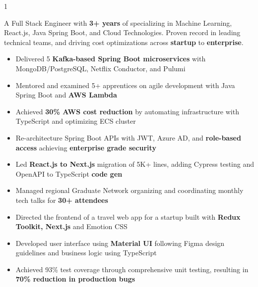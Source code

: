 \documentclass[11pt,a4paper,ragged2e]{altacv}
\begin{document}

\makecvheader


\begin{paracol}{1}
\smallskip
{}

A Full Stack Engineer with \textbf{3+ years} of specializing in Machine Learning, React.js, Java Spring Boot, and Cloud Technologies. Proven record in leading technical teams, and driving cost optimizations across \textbf{startup} to \textbf{enterprise}.
\smallskip


\begin{itemize}
\item Delivered 5 \textbf{Kafka-based Spring Boot microservices} with MongoDB/PostgreSQL, Netflix Conductor, and Pulumi
\item Mentored and examined 5+ apprentices on agile development with Java Spring Boot and \textbf{AWS Lambda}
\item Achieved \textbf{30\% AWS cost reduction} by automating infrastructure with TypeScript and optimizing ECS cluster
\item Re-architecture Spring Boot APIs with JWT, Azure AD, and \textbf{role-based access} achieving \textbf{enterprise grade security}
\item Led \textbf{React.js to Next.js} migration of 5K+ lines, adding Cypress testing and OpenAPI to TypeScript \textbf{code gen}
\item Managed regional Graduate Network organizing and coordinating monthly tech talks for \textbf{30+ attendees}
\end{itemize}
\tightdivider

\begin{itemize}
\item Directed the frontend of a travel web app for a startup built with \textbf{Redux Toolkit, Next.js} and Emotion CSS
\item Developed user interface using \textbf{Material UI} following Figma design guidelines and business logic using TypeScript
\item Achieved 93\% test coverage through comprehensive unit testing, resulting in \textbf{70\% reduction in production bugs}
\end{itemize}
\tightdivider


\end{paracol}
\end{document}
